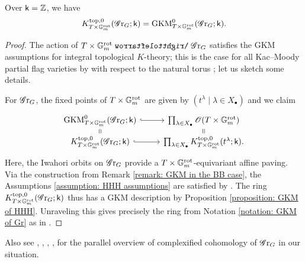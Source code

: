 \begin{proposition}\label{proposition: GKM description of K-theory of Gr}
Over $\mathsf{k}=\operatorname{\mathbb{Z}}$, we have
\begin{equation*}
K^{\mathrm{top}, 0}_{T \times \mathbb{G}_m^{\mathrm{rot}}}(\operatorname{\mathscr{G}r}_G; \mathsf{k}) = \operatorname{GKM}^{0}_{T \times \mathbb{G}_m^{\mathrm{rot}}}(\operatorname{\mathscr{G}r}_G; \mathsf{k}). 
\end{equation*}
\end{proposition}
\begin{proof}
The action of $T \times \Gm^{\rot} \acts \Gr_G$ satisfies the GKM assumptions for integral topological $K$-theory; this is the case for all Kac--Moody partial flag varieties by with respect to the natural torus \cite[\S 5]{HHH05}; let us sketch some details.

For $\operatorname{\mathscr{G}r}_G$, the fixed points of $T\times \mathbb{G}_m^{\mathrm{rot}}$ are given by $(t^{\lambda} \mid \lambda \in X_{\bullet})$ and we claim
\begin{equation*}
\begin{tikzcd}[row sep=5]
\GKM^{0}_{T \times \Gm^{\rot}}(\Gr_G; \k) \arrow[r, hookrightarrow] & \prod_{\lambda \in X_{\bullet}} \O(T \times \Gm^{\rot})\\
K^{\top, 0}_{T \times \Gm^{\rot}}(\Gr_G; \k) \arrow[u, equal] \arrow[r, hookrightarrow] & \prod_{\lambda \in X_{\bullet}} K^{\top, 0}_{T\times \Gm^{\rot}}(t^{\lambda}; \k) \arrow[u, equal].
\end{tikzcd}
\end{equation*}
Here, the Iwahori orbits on $\operatorname{\mathscr{G}r}_G$ provide a $T\times \mathbb{G}_m^{\mathrm{rot}}$-equivariant affine paving. Via the construction from Remark \ref{remark: GKM in the BB case}, the Assumptions \ref{assumption: HHH assumptions} are satisfied by \cite[\S 5, p.211]{HHH05}. The ring $K^{\mathrm{top}, 0}_{T \times \mathbb{G}_m^{\mathrm{rot}}}(\operatorname{\mathscr{G}r}_G; \mathsf{k})$ thus has a GKM description by Proposition \ref{proposition: GKM of HHH}. Unraveling this gives precisely the ring from Notation \ref{notation: GKM of Gr} as in \cite{HHH05}. 
\end{proof}


\begin{remark}
Also see \cite{HHH05}, \cite[\S 2.2.3]{BBSV22}, \cite{Par17}, \cite[Appendix A]{Sit24}, \cite{Shi14} for the parallel overview of complexified cohomology of $\operatorname{\mathscr{G}r}_G$ in our situation.
\end{remark}





